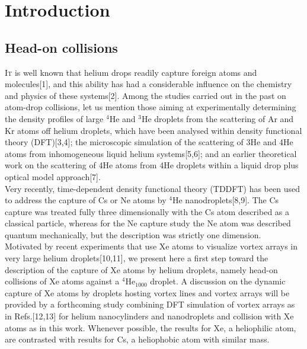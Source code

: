 \chapter{Introduction}
	\section{Head-on collisions}
		\lettrine[lines=3,findent=3pt,nindent=0pt]{I}{t} is well known that helium drops readily capture foreign atoms and molecules[1], and this ability has had a considerable influence on the chemistry and physics of these systems[2]. Among the studies carried out in the past on atom-drop collisions, let us mention those aiming at experimentally determining the density profiles of large $^4$He and $^3$He droplets from the scattering of Ar and Kr atoms off helium droplets, which have been analysed within density functional theory (DFT)[3,4]; the microscopic simulation of the scattering of 3He and 4He atoms from inhomogeneous liquid helium systems[5,6]; and an earlier theoretical work on the scattering of 4He atoms from 4He droplets within a liquid drop plus optical model approach[7].\\

		Very recently, time-dependent density functional theory (TDDFT) has been used to address the capture of Cs or Ne atoms by $^4$He nanodroplets[8,9]. The Cs capture was treated fully three dimensionally with the Cs atom described as a classical particle, whereas for the Ne capture study the Ne atom was described quantum mechanically, but the description was strictly one dimension.\\

		Motivated by recent experiments that use Xe atoms to visualize vortex arrays in very large helium droplets[10,11], we present here a first step toward the description of the capture of Xe atoms by helium droplets, namely head-on collisions of Xe atoms against a $^4$He$_{1000}$ droplet. A discussion on the dynamic capture of Xe atoms by droplets hosting vortex lines and vortex arrays will be provided by a forthcoming study combining DFT simulation of vortex arrays as in Refs.[12,13] for helium nanocylinders and nanodroplets and collision with Xe atoms as in this work. Whenever possible, the results for Xe, a heliophilic atom, are contrasted with results for Cs, a heliophobic atom with similar mass.

